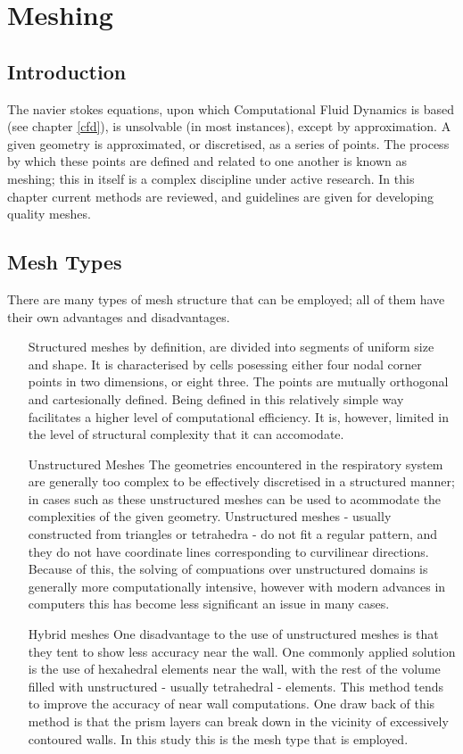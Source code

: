 \section{Meshing}
\subsection{Introduction}

The navier stokes equations, upon which Computational Fluid Dynamics is based (see chapter \ref{cfd}), is unsolvable (in most instances), except by approximation. A given geometry is approximated, or discretised, as a series of points. The process by which these points are defined and related to one another is known as meshing; this in itself is a complex discipline under active research. In this chapter current methods are reviewed, and guidelines are given for developing quality meshes.

\subsection{Mesh Types} \label{mtypes}

There are many types of mesh structure that can be employed; all of them have their own advantages and disadvantages. 

\begin{itemize}
  \item[Structured meshes]
    by definition, are divided into segments of uniform size and shape. It is characterised by cells posessing either four nodal corner points in two dimensions, or eight three. The points are mutually orthogonal and cartesionally defined. Being defined in this relatively simple way facilitates a higher level of computational efficiency. It is, however, limited in the level of structural complexity that it can accomodate.

  \item[Unstructured Meshes]
    The geometries encountered in the respiratory system are generally too complex to be effectively discretised in a structured manner; in cases such as these unstructured meshes can be used to acommodate the complexities of the given geometry. Unstructured meshes - usually constructed from triangles or tetrahedra - do not fit a regular pattern, and they do not have coordinate lines corresponding to curvilinear directions. Because of this, the solving of compuations over unstructured domains is generally more computationally intensive, however with modern advances in computers this has become less significant an issue in many cases.

  \item[Hybrid meshes]
    One disadvantage to the use of unstructured meshes is that they tent to show less accuracy near the wall. One commonly applied solution is the use of hexahedral elements near the wall, with the rest of the volume filled with unstructured - usually tetrahedral - elements. This method tends to improve the accuracy of near wall computations. One draw back of this method is that the prism layers can break down in the vicinity of excessively contoured walls. In this study this is the mesh type that is employed.

\end{itemize}

